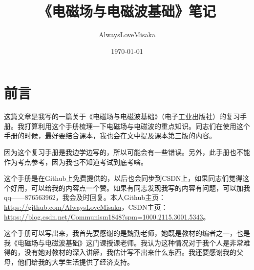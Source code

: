 \documentclass[UTF8,a4paper,11pt]{article}
\title{\huge\heiti《电磁场与电磁波基础》笔记}
\author{AlwaysLoveMisaka}
\date{\today}
\begin{document}
\maketitle
\thispagestyle{empty}
\clearpage

\tableofcontents
\setcounter{page}{1}
\clearpage


\setcounter{page}{1}
\section{前言}
这篇文章是我写的一篇关于《电磁场与电磁波基础》（电子工业出版社）的复习手册。我打算利用这个手册梳理一下电磁场与电磁波的重点知识。同志们在使用这个手册的时候，最好要结合课本，我也会在文中提及课本第三版的内容。

因为这个复习手册是我边学边写的，所以可能会有一些错误。另外，此手册也不能作为考点参考，因为我也不知道考试到底考啥。

这个手册是在Github上免费提供的，以后也会同步到CSDN上，如果同志们觉得这个好用，可以给我的内容点一个赞。如果有同志发现我写的内容有问题，可以加我qq——876563962，我会及时回复。本人Github主页：\url{https://github.com/AlwaysLoveMisaka}，CSDN主页：\url{https://blog.csdn.net/Communism1848?spm=1000.2115.3001.5343}。

这个手册可以写出来，我首先要感谢的是魏勤老师，她既是教材的编者之一，也是我《电磁场与电磁波基础》这门课授课老师。我认为这种情况对于我个人是非常难得的，没有她对教材的深入讲解，我估计写不出来什么东西。我还要感谢我的父母，他们给我的大学生活提供了经济支持。
\end{document}
